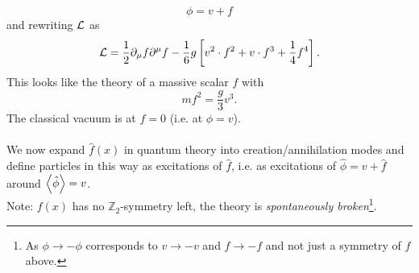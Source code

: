 \begin{equation}
	\phi=v+f
\end{equation}
and rewriting $\mathcal{L}$ as 
\begin{equation}
	\label{eq:ssbLagrangian}
	\mathcal{L} = \frac{1}{2} \partial_\mu f \partial^\mu f - \frac{1}{6} g \left[ v^2 \cdot f^2+ v\cdot f^3 + \frac{1}{4} f^4\right].
\end{equation}
This looks like the theory of a massive scalar $f$ with 
\begin{equation}
	m f^2 = \frac{g}{3} v^3.
\end{equation}
The classical vacuum is at $f=0$ (i.e. at $\phi=v$). \\
\\
We now expand $\hat{f}(x)$ in quantum theory into creation/annihilation modes and  define particles in this way as excitations of $\hat{f}$, i.e. as excitations of $\hat{\phi} = v+ \hat{f}$ around $\expval{\hat{ \phi}}=v$.\\
Note: $f(x)$ has no $\mathbb{Z}_2$-symmetry left, the theory is \emph{spontaneously broken}\footnote{As $\phi\rightarrow -\phi$ corresponds to $v\rightarrow -v$ and $f \rightarrow - f$ and not just a symmetry of $f$ above.}.
